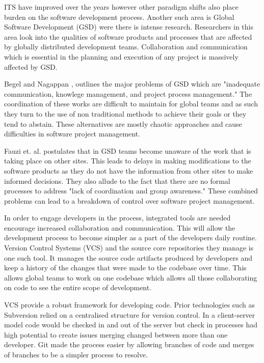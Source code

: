 \documentclass{mproj}
\begin{document}

ITS have improved over the years however other paradigm shifts also place burden on the software development process. Another such area is Global Software Development (GSD) were there is intense research. Researchers in this area look into the qualities of software products and processes that are affected by globally distributed development teams. Collaboration and communication which is essential in the planning and execution of any project is massively affected by GSD.

Begel and Nagappan \cite{Begel:2008}, outlines the major problems of GSD which are "inadequate communication, knowlege management, and project process management." The coordination of these works are difficult to maintain for global teams and as such they turn to the use of non traditional methods to achieve their goals or they tend to abstain. These alternatives are mostly chaotic approaches and cause difficulties in software project management.

Fauzi et. al. \cite{Fauzi:2010} postulates that in GSD teams become unaware of the work that is taking place on other sites. This leads to delays in making modifications to the software products as they do not have the information from other sites to make informed decisions. They also allude to the fact that there are no formal processes to address "lack of coordination and group awareness." These combined problems can lead to a breakdown of control over software project management.

In order to engage developers in the process, integrated tools are needed encourage increased collaboration and communication. This will allow the development process to become simpler as a part of the developers daily routine. Version Control Systems (VCS) and the source core repositories they manage is one such tool. It manages the source code artifacts produced by developers and keep a history of the changes that were made to the codebase over time. This allows global teams to work on one codebase which allows all those collaborating on code to see the entire scope of development. 


VCS provide a robust framework for developing code. Prior technologies such as Subversion relied on a centralised structure for version control. In a client-server model code would be checked in and out of the server but check in processes had high potential to create issues merging changed between more than one developer. Git made the process easier by allowing branches of code and merges of branches to be a simpler process to resolve.
\end{document}
